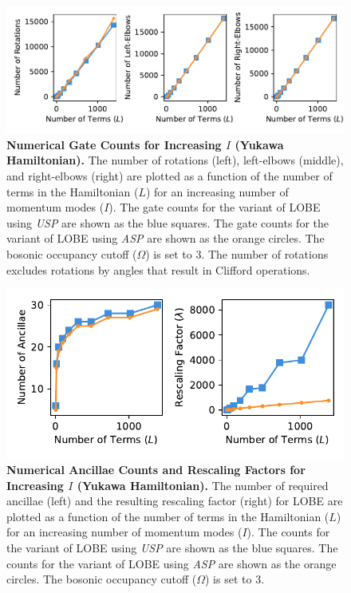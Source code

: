 \begin{figure}
    \centering
    \includegraphics[width=16cm]{figures/Yukawa_hamiltonian_gates_vs_terms.pdf}
    \caption{
        \textbf{Numerical Gate Counts for Increasing $I$ (Yukawa Hamiltonian).}
        The number of rotations (left), left-elbows (middle), and right-elbows (right) are plotted as a function of the number of terms in the Hamiltonian ($L$) for an increasing number of momentum modes ($I$).
        The gate counts for the variant of LOBE using \textit{USP} are shown as the blue squares.
        The gate counts for the variant of LOBE using \textit{ASP} are shown as the orange circles.
        The bosonic occupancy cutoff ($\Omega$) is set to $3$.
        The number of rotations excludes rotations by angles that result in Clifford operations.
    }
    \label{fig:Yukawa_hamiltonian_gates_vs_terms}
\end{figure}
\begin{figure}
    \centering
    \includegraphics[width=12cm]{figures/Yukawa_hamiltonian_qubits_and_rescaling_vs_terms.pdf}
    \caption{
        \textbf{Numerical Ancillae Counts and Rescaling Factors for Increasing $I$ (Yukawa Hamiltonian).}
        The number of required ancillae (left) and the resulting rescaling factor (right) for LOBE are plotted as a function of the number of terms in the Hamiltonian ($L$) for an increasing number of momentum modes ($I$).
        The counts for the variant of LOBE using \textit{USP} are shown as the blue squares.
        The counts for the variant of LOBE using \textit{ASP} are shown as the orange circles.
        The bosonic occupancy cutoff ($\Omega$) is set to $3$.
    }
    \label{fig:Yukawa_hamiltonian_qubits_and_rescaling_vs_terms}
\end{figure}


